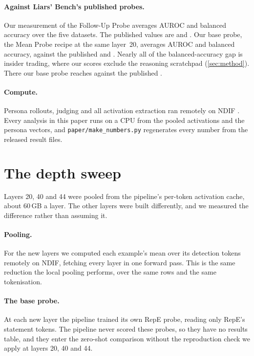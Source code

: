 \paragraph{Against Liars' Bench's published probes.} Our measurement of the Follow-Up Probe
averages  AUROC and  balanced accuracy over the five
datasets. The published values are  and 
\citep[Table~7]{kretschmar2025liars}. Our base probe, the Mean Probe recipe at the same layer~20,
averages  AUROC and  balanced accuracy, against the
published  and  \citep[Table~6]{kretschmar2025liars}.
Nearly all of the balanced-accuracy gap is insider trading, where our scores exclude the reasoning
scratchpad (\cref{sec:method}). There our base probe reaches  against the
published .

\paragraph{Compute.} Persona rollouts, judging and all activation extraction ran remotely on NDIF
\citep{fiottokaufman2024nnsight}. Every analysis in this paper runs on a CPU from the pooled
activations and the persona vectors, and \nolinkurl{paper/make_numbers.py} regenerates every number
from the released result files.

\section{The depth sweep}
\label{app:depth}

Layers 20, 40 and 44 were pooled from the pipeline's per-token activation cache, about 60\,GB a
layer. The other  layers were built differently, and we measured the difference
rather than assuming it.

\paragraph{Pooling.} For the new layers we computed each example's mean over its detection tokens
remotely on NDIF, fetching every layer in one forward pass. This is the same reduction the local
pooling performs, over the same rows and the same tokenisation.

\paragraph{The base probe.} At each new layer the pipeline trained its own RepE probe, reading
only RepE's statement tokens. The pipeline never scored these probes, so they have no results
table, and they enter the zero-shot comparison without the reproduction check we apply at layers
20, 40 and 44.


